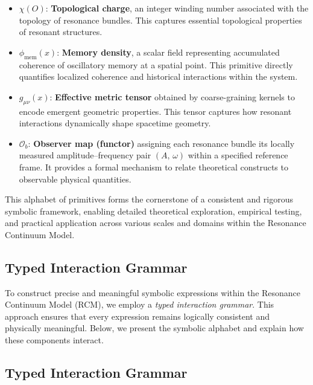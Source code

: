 \begin{itemize}
    \item $\chi(O)$: \textbf{Topological charge}, an integer winding number associated with the topology of resonance bundles. This captures essential topological properties of resonant structures.

    \item $\phi_{\mathrm{mem}}(x)$: \textbf{Memory density}, a scalar field representing accumulated coherence of oscillatory memory at a spatial point. This primitive directly quantifies localized coherence and historical interactions within the system.

    \item $g_{\mu\nu}(x)$: \textbf{Effective metric tensor} obtained by coarse-graining kernels to encode emergent geometric properties. This tensor captures how resonant interactions dynamically shape spacetime geometry.

    \item $\mathcal{O}_b$: \textbf{Observer map (functor)} assigning each resonance bundle its locally measured amplitude--frequency pair $(A,\,\omega)$ within a specified reference frame. It provides a formal mechanism to relate theoretical constructs to observable physical quantities.
\end{itemize}

This alphabet of primitives forms the cornerstone of a consistent and rigorous symbolic framework, enabling detailed theoretical exploration, empirical testing, and practical application across various scales and domains within the Resonance Continuum Model.

\bigskip
\subsection{Typed Interaction Grammar}
\label{subsec3:typed-interaction-grammar}

To construct precise and meaningful symbolic expressions within the Resonance Continuum Model (RCM), we employ a \emph{typed interaction grammar}.  This approach ensures that every expression remains logically consistent and physically meaningful.  Below, we present the symbolic alphabet and explain how these components interact.

\providecommand{\NT}[1]{\texttt{#1}}
\providecommand{\bnfis}{\;::=\;}
\providecommand{\alt}{\;\mid\;}

\subsection{Typed Interaction Grammar}
\label{subsec3:typed-interaction-grammar}


